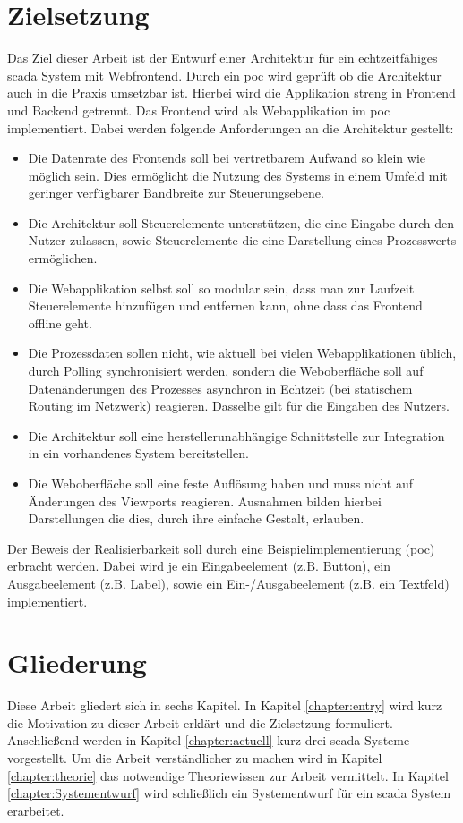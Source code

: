 \section{Zielsetzung}
Das Ziel dieser Arbeit ist der Entwurf einer Architektur für ein
echtzeitfähiges \ac{scada} System mit Webfrontend.
Durch ein \ac{poc} wird geprüft ob die Architektur auch in die Praxis umsetzbar ist.
Hierbei wird die Applikation streng in Frontend und Backend getrennt. Das Frontend wird als Webapplikation im \ac{poc} implementiert.
Dabei werden folgende Anforderungen an die Architektur gestellt:
\begin{itemize}
    \item   Die Datenrate des Frontends soll bei vertretbarem Aufwand so klein wie möglich sein.
            Dies ermöglicht die Nutzung des Systems in einem Umfeld mit geringer verfügbarer Bandbreite zur Steuerungsebene.
    \item   Die Architektur soll Steuerelemente unterstützen, die eine Eingabe durch den Nutzer zulassen, sowie Steuerelemente die eine Darstellung eines Prozesswerts ermöglichen.
    \item   Die Webapplikation selbst soll so modular sein, dass man zur Laufzeit Steuerelemente hinzufügen und entfernen kann, ohne dass das Frontend offline geht.
    \item   Die Prozessdaten sollen nicht, wie aktuell bei vielen Webapplikationen üblich, durch Polling synchronisiert werden, sondern die Weboberfläche soll auf Datenänderungen des Prozesses asynchron in Echtzeit (bei statischem Routing im Netzwerk) reagieren. Dasselbe gilt für die Eingaben des Nutzers.
    \item   Die Architektur soll eine herstellerunabhängige Schnittstelle zur Integration in ein vorhandenes System bereitstellen.
    \item   Die Weboberfläche soll eine feste Auflösung haben und muss nicht auf Änderungen des Viewports reagieren.
            Ausnahmen bilden hierbei Darstellungen die dies, durch ihre einfache Gestalt, erlauben.
\end{itemize}
Der Beweis der Realisierbarkeit soll durch eine Beispielimplementierung (\ac{poc}) erbracht werden.
Dabei wird je ein Eingabeelement (z.B. Button), ein Ausgabeelement (z.B. Label), sowie ein Ein-/Ausgabeelement (z.B. ein Textfeld) implementiert.

\section{Gliederung}
Diese Arbeit gliedert sich in sechs Kapitel. In Kapitel \ref{chapter:entry} wird kurz die Motivation zu dieser Arbeit erklärt und die Zielsetzung formuliert.
Anschließend werden in Kapitel \ref{chapter:actuell} kurz drei \ac{scada} Systeme vorgestellt. 
Um die Arbeit verständlicher zu machen wird in Kapitel \ref{chapter:theorie} das notwendige Theoriewissen zur Arbeit vermittelt.
In Kapitel \ref{chapter:Systementwurf} wird schließlich ein Systementwurf für ein \ac{scada} System erarbeitet.